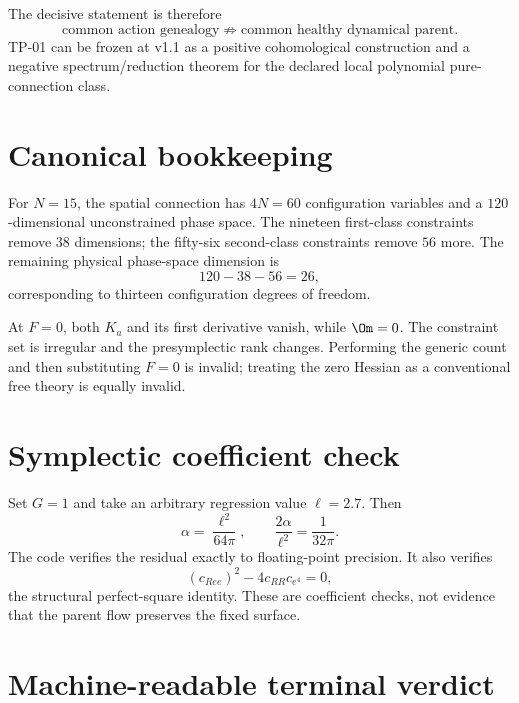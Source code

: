 The decisive statement is therefore
\[
\boxed{
\text{common action genealogy}
\not\Rightarrow
\text{common healthy dynamical parent}.}
\]
TP-01 can be frozen at v1.1 as a positive cohomological construction and a negative spectrum/reduction theorem for the declared local polynomial pure-connection class.

\appendix

\section{Canonical bookkeeping}

For $N=15$, the spatial connection has $4N=60$ configuration variables and a $120$-dimensional unconstrained phase space.  The nineteen first-class constraints remove $38$ dimensions; the fifty-six second-class constraints remove $56$ more.  The remaining physical phase-space dimension is
\[
120-38-56=26,
\]
corresponding to thirteen configuration degrees of freedom.

At $F=0$, both $K_a$ and its first derivative vanish, while $\Om=0$.  The constraint set is irregular and the presymplectic rank changes.  Performing the generic count and then substituting $F=0$ is invalid; treating the zero Hessian as a conventional free theory is equally invalid.

\section{Symplectic coefficient check}

Set $G=1$ and take an arbitrary regression value $\ell=2.7$.  Then
\[
\alpha=\frac{\ell^2}{64\pi},
\qquad
\frac{2\alpha}{\ell^2}=\frac{1}{32\pi}.
\]
The code verifies the residual exactly to floating-point precision.  It also verifies
\[
(c_{Ree})^2-4c_{RR}c_{e^4}=0,
\]
the structural perfect-square identity.  These are coefficient checks, not evidence that the parent flow preserves the fixed surface.

\section{Machine-readable terminal verdict}

